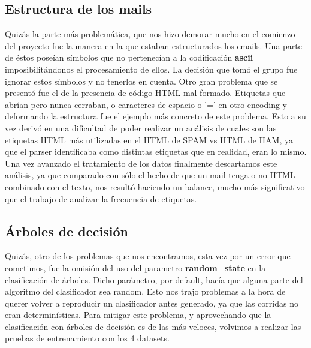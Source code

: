 \subsection*{Estructura de los mails}
Quizás la parte más problemática, que nos hizo demorar mucho en el comienzo del proyecto fue la manera en la que estaban estructurados los emails. Una parte de éstos poseían símbolos que no pertenecían a la codificación \textbf{ascii} imposibilitándonos el procesamiento de ellos. La decisión que tomó el grupo fue ignorar estos símbolos y no tenerlos en cuenta.
Otro gran problema que se presentó fue el de la presencia de código HTML mal formado. Etiquetas que abrían pero nunca cerraban, o caracteres de espacio o '=' en otro encoding y deformando la estructura fue el ejemplo más concreto de este problema. Esto a su vez derivó en una dificultad de poder realizar un análisis de cuales son las etiquetas HTML más utilizadas en el HTML de SPAM vs HTML de HAM, ya que el parser identificaba como distintas etiquetas que en realidad, eran lo mismo. Una vez avanzado el tratamiento de los datos finalmente descartamos este análisis, ya que comparado con sólo el hecho de que un mail tenga o no HTML combinado con el texto, nos resultó haciendo un balance, mucho más significativo que el trabajo de analizar la frecuencia de etiquetas.

\subsection*{Árboles de decisión}
Quizás, otro de los problemas que nos encontramos, esta vez por un error que cometimos, fue la omisión del uso del parametro \textbf{random\_state} en la clasificación de árboles. Dicho parámetro, por default, hacía que alguna parte del algoritmo del clasificador sea random. Esto nos trajo problemas a la hora de querer volver a reproducir un clasificador antes generado, ya que las corridas no eran determinísticas. Para mitigar este problema, y aprovechando que la clasificación con árboles de decisión es de las más veloces, volvimos a realizar las pruebas de entrenamiento con los 4 datasets.

